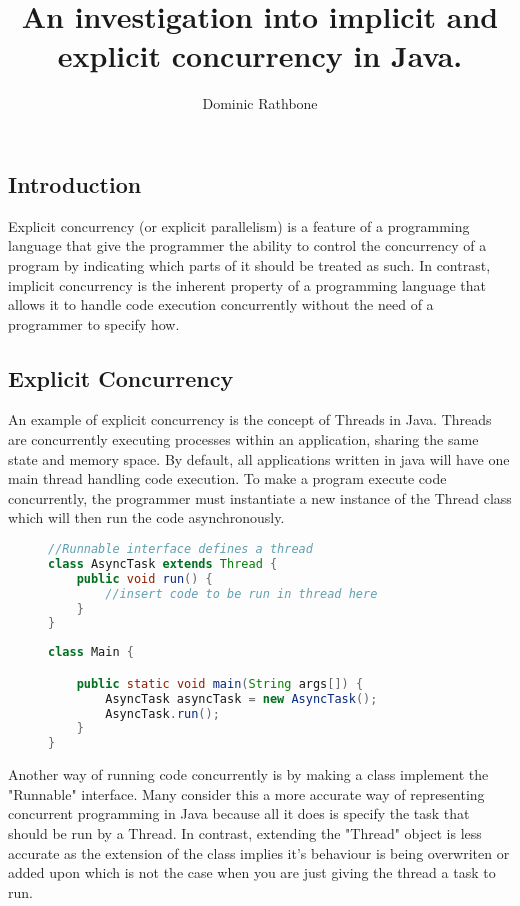 \documentclass[]{report}
\title{An investigation into implicit and explicit concurrency in Java.}
\author{Dominic Rathbone}
\begin{document}
\maketitle

\subsection{Introduction}
Explicit concurrency (or explicit parallelism) is a feature of a programming language that give the programmer the ability to control the concurrency of a program by indicating which parts of it should be treated as such. In contrast, implicit concurrency is the inherent property of a programming language that allows it to handle code execution concurrently without the need of a programmer to specify how.

\subsection{Explicit Concurrency}
An example of explicit concurrency is the concept of Threads in Java. Threads are concurrently executing processes within an application, sharing the same state and memory space. By default, all applications written in java will have one main thread handling code execution. To make a program execute code concurrently, the programmer must instantiate a new instance of the Thread class which will then run the code asynchronously.

\begin{figure}[h!]
\caption{}
\begin{lstlisting}[language=Java,frame=single]
//Runnable interface defines a thread
class AsyncTask extends Thread {
	public void run() {
		//insert code to be run in thread here
	}
}
\end{lstlisting}
\end{figure}

\begin{figure}[h!]
\caption{}
\begin{lstlisting}[language=Java,frame=single]
class Main {

	public static void main(String args[]) { 
		AsyncTask asyncTask = new AsyncTask();
		AsyncTask.run();
	}
}
\end{lstlisting}
\end{figure}

Another way of running code concurrently is by making a class implement the "Runnable" interface. Many consider this a more accurate way of representing concurrent programming in Java because all it does is specify the task that should be run by a Thread. In contrast, extending the "Thread" object is less accurate as the extension of the class implies it's behaviour is being overwriten or added upon which is not the case when you are just giving the thread a task to run.
\end{document}
